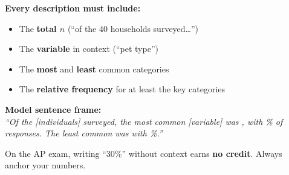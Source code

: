 \documentclass[aspectratio=169, 11pt]{beamer}
\begin{document}
{
\begin{frame}[t, plain]
  \hspace{0.55cm}%
  \begin{minipage}{0.9\textwidth}
    \small

    \textbf{\color{navy}Every description must include:}
    \begin{itemize}
      \setlength{\itemsep}{0.4em}
      \item The \textbf{total $n$} (``of the 40 households surveyed\ldots'')
      \item The \textbf{variable} in context (``pet type'')
      \item The \textbf{most} and \textbf{least} common categories
      \item The \textbf{relative frequency} for at least the key categories
    \end{itemize}

    \vspace{0.5cm}
    {\color{navy}\bfseries\small Model sentence frame:}\\[6pt]
    \small\textit{``Of the \underline{\hspace{1cm}} [individuals] surveyed, the most
    common [variable] was \underline{\hspace{1.5cm}}, with \underline{\hspace{1cm}}\%
    of responses. The least common was \underline{\hspace{1.5cm}} with
    \underline{\hspace{1cm}}\%.''}

    \vspace{0.4cm}
    {\color{slate}\footnotesize
      On the AP exam, writing ``30\%'' without context earns \textbf{no credit}.
      Always anchor your numbers.}
  \end{minipage}
\end{frame}
}
\end{document}
